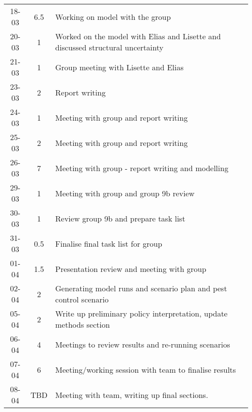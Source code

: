 \begin{longtable}[c]{c|c|m{35em}}
 18-03 & 6.5  & Working on model with the group \\
 20-03 & 1 & Worked on the model with Elias and Lisette and discussed structural uncertainty \\
 21-03 & 1 & Group meeting with Lisette and Elias\\
 23-03 & 2 & Report writing\\
 24-03 & 1 & Meeting with group and report writing\\
 25-03 & 2 & Meeting with group and report writing\\
 26-03 & 7 & Meeting with group - report writing and modelling\\
 29-03 & 1 & Meeting with group and group 9b review\\
 30-03 & 1 & Review group 9b and prepare task list\\
 31-03 & 0.5 & Finalise final task list for group\\
 01-04 & 1.5 & Presentation review and meeting with group\\
 02-04 & 2 & Generating model runs and scenario plan and pest control scenario\\
 05-04 & 2 & Write up preliminary policy interpretation, update methods section\\
 06-04 & 4 & Meetings to review results and re-running scenarios\\
 07-04 & 6 & Meeting/working session with team to finalise results\\
 08-04 & TBD & Meeting with team, writing up final sections.
 

\end{longtable}

